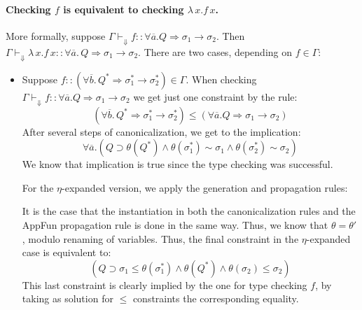 \documentclass[12pt]{article}
\begin{document}
\paragraph{Checking $f$ is equivalent to checking $\lambda \, x. f \, x$.} More formally, suppose $\Gamma \vdash_{\Downarrow} f :: \forall \overline{a}. Q \Rightarrow \sigma_1 \to \sigma_2$. Then $\Gamma \vdash_{\Downarrow} \lambda \, x. f \, x :: \forall \overline{a}. \, Q \Rightarrow \sigma_1 \to \sigma_2$. There are two cases, depending on $f \in \Gamma$:
\begin{itemize}
\item Suppose $f :: (\forall \overline{b}. \, Q^* \Rightarrow \sigma^*_1 \to \sigma^*_2) \in \Gamma$. When checking $\Gamma \vdash_{\Downarrow} f :: \forall \overline{a}. Q \Rightarrow \sigma_1 \to \sigma_2$ we get just one constraint by the {\sc [VarCon]} rule:
$$(\forall \overline{b}. \, Q^* \Rightarrow \sigma^*_1 \to \sigma^*_2)
\leq (\forall \overline{a}. Q \Rightarrow \sigma_1 \to \sigma_2)$$
After several steps of canonicalization, we get to the implication:
$$\forall \overline{a}. \left( Q \supset \theta(Q^*) \wedge \theta(\sigma^*_1) \sim \sigma_1 \wedge \theta(\sigma^*_2) \sim \sigma_2 \right)$$
We know that implication is true since the type checking was successful.

For the $\eta$-expanded version, we apply the generation and propagation rules:
\vspace{-0.5cm}
\begin{prooftree}
\end{prooftree}
It is the case that the instantiation in both the canonicalization rules and the {\sc AppFun} propagation rule is done in the same way. Thus, we know that $\theta = \theta'$, modulo renaming of variables. Thus, the final constraint in the $\eta$-expanded case is equivalent to:
$$\left( Q \supset \sigma_1 \leq \theta(\sigma^*_1) \wedge \theta(Q^*) \wedge \theta(\sigma_2) \leq \sigma_2 \right)$$
This last constraint is clearly implied by the one for type checking $f$, by taking as solution for $\leq$ constraints the corresponding equality.


\end{itemize}
\end{document}
